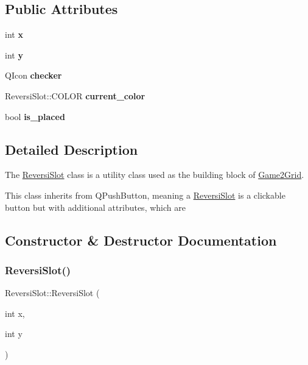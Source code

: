 \subsection*{Public Attributes}
\begin{DoxyCompactItemize}
\item 
\mbox{\label{classReversiSlot_a25bc826b1690c763e695f3817cc40068}} 
int {\bfseries x}
\item 
\mbox{\label{classReversiSlot_a5d446f8044adf9aeffc665b341a7ab21}} 
int {\bfseries y}
\item 
\mbox{\label{classReversiSlot_aafe297511fff8ba594481477f9f80d6e}} 
Q\+Icon {\bfseries checker}
\item 
\mbox{\label{classReversiSlot_a5f0da16f014d9af688bd6658d7b89836}} 
Reversi\+Slot\+::\+C\+O\+L\+OR {\bfseries current\+\_\+color}
\item 
\mbox{\label{classReversiSlot_a8ef75203a905d987eccef61999e9ae6a}} 
bool {\bfseries is\+\_\+placed}
\end{DoxyCompactItemize}


\subsection{Detailed Description}
The \hyperlink{classReversiSlot}{Reversi\+Slot} class is a utility class used as the building block of \hyperlink{classGame2Grid}{Game2\+Grid}. 

This class inherits from Q\+Push\+Button, meaning a \hyperlink{classReversiSlot}{Reversi\+Slot} is a clickable button but with additional attributes, which are~\newline


\subsection{Constructor \& Destructor Documentation}
\mbox{\label{classReversiSlot_a68d3c8efd58f9754fd7338287a391550}} 
\subsubsection{\texorpdfstring{Reversi\+Slot()}{ReversiSlot()}}
{\footnotesize\ttfamily Reversi\+Slot\+::\+Reversi\+Slot (\begin{DoxyParamCaption}\item[{int}]{x,  }\item[{int}]{y }\end{DoxyParamCaption})}



